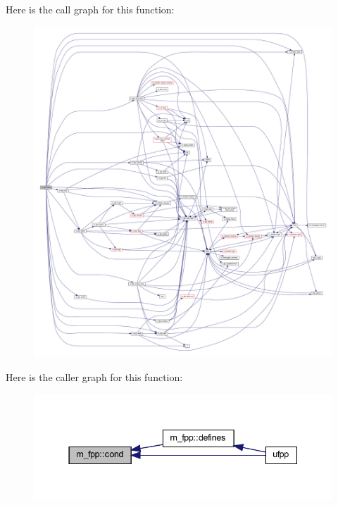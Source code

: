 Here is the call graph for this function\+:
\nopagebreak
\begin{figure}[H]
\begin{center}
\leavevmode
\includegraphics[width=350pt]{namespacem__fpp_a3aa7c291b265d02ad91b3bb29e797156_cgraph}
\end{center}
\end{figure}
Here is the caller graph for this function\+:
\nopagebreak
\begin{figure}[H]
\begin{center}
\leavevmode
\includegraphics[width=337pt]{namespacem__fpp_a3aa7c291b265d02ad91b3bb29e797156_icgraph}
\end{center}
\end{figure}
\mbox{\label{namespacem__fpp_a6044fedc32afb4caa50f83a17d324e5b}} 
